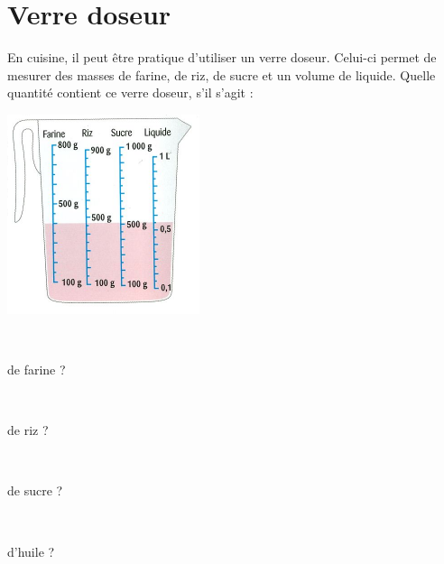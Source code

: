 \section{Verre doseur}


En cuisine, il peut être pratique d'utiliser un verre doseur. Celui-ci permet de mesurer des masses de farine, de riz, de sucre et un volume de liquide.
Quelle quantité contient ce verre doseur, s'il s'agit :

\begin{center}
	\includegraphics[scale=0.9]{img/verre}
\end{center}
\begin{questions}
	
	\begin{multicols}{4}
		
	\question[] \ 
	
	de farine ? 
	
	
	\question[] \ 
	
	de riz ?
	
	
	\question[] \ 
	
	de sucre ? 
	
	
	\question[] \ 
	
	d'huile ?
	\end{multicols}
	
\end{questions}